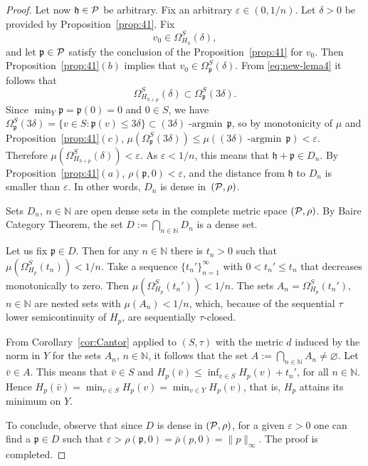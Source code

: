 \documentclass[12pt,leqno]{article}
\theoremstyle{definition}
\theoremstyle{remark}
\def\ds{\displaystyle}
\def\N{\mathbb{N}}
\def\eps{\varepsilon}
\DeclareMathOperator*{\argmin}{-argmin\,}
\begin{document}
\begin{proof}
\smallskip

Let now $\mathfrak{h}\in \cal{P}$ be arbitrary. Fix an arbitrary $\varepsilon \in (0,1/n)$.
Let $\delta > 0$ be provided by Proposition~\ref{prop:41}. Fix
$$
  v_0 \in \Omega_{H_h}^S (\delta),
$$
and let $ \mathfrak{p}\in \cal{P}$ satisfy the conclusion of the Proposition~\ref{prop:41} for $v_0$. Then Proposition~\ref{prop:41}$(b)$ implies that $v_0\in \Omega_{\mathfrak{p}}^S(\delta)$. From  \eqref{eq:new-lema4} it follows that
$$
  \Omega_{H_{h+p}}^S(\delta) \subset \Omega_{\mathfrak{p}}^S (3\delta).
$$
Since $\min_Y \mathfrak{p} = \mathfrak{p}(0)= 0$ and $0\in S$, we have $\Omega^S_\mathfrak{p}(3\delta) = \{v\in S:\mathfrak{p}(v)\le 3\delta\}\subset (3\delta)\argmin \mathfrak{p}$, so by monotonicity of $\mu$ and Proposition~\ref{prop:41}$(c)$, $\mu(\Omega^S_\mathfrak{p}(3\delta))\le \mu((3\delta)\argmin\mathfrak{p}) <\varepsilon$. Therefore $\mu (\Omega_{H_{h+p}}^S(\delta)) < \varepsilon$.
As $\varepsilon<1/n$, this means that $\mathfrak{h}+\mathfrak{p}\in D_n$. By  Proposition~\ref{prop:41}$(a)$, $\rho(\mathfrak{p},0)<\varepsilon$, and the distance from $\mathfrak{h}$ to $D_n$ is smaller than $\eps$. In other words, $D_n$ is dense in~$(\cal{P},\rho)$.



Sets $D_n$, $n\in \N$  are open dense sets in the complete metric space $({\cal{P}},\rho)$. By Baire Category Theorem, the set $\ds D:=\bigcap_{n\in \N} D_n$ is a dense set.

Let us fix $\mathfrak{p}\in D$. Then for any $n\in \N$ there is $t_n>0$ such that $\mu (\Omega_{H_p}^S(t_n))<1/n$. Take a sequence $\{t_n'\}_{n=1}^\infty$ with $0 < t_n' \le t_n$ that decreases monotonically to zero. Then $\mu (\Omega_{H_p}^S(t_n'))<1/n$. The sets  $A_n=\Omega_{H_p}^S(t_n')$, $n\in \N$  are  nested sets with $\mu(A_n)<1/n$, which, because of the sequential $\tau$ lower semicontinuity of $H_p$, are   sequentially $\tau$-closed.

From Corollary~\ref{cor:Cantor}   applied  to $(S,\tau)$ with the metric $d$ induced by the  norm in $Y$ for the sets $A_n$, $n\in \N$, it follows that the set $\ds A:=\bigcap_{n\in \N} A_n\neq\varnothing$. Let $\bar v\in A$. This means that $\bar v\in S$ and $\ds H_p(\bar v)\le \inf_{v\in S} H_p( v) +t_n'$, for all $n\in \N$. Hence $H_p(\bar v)= \min_{v\in S} H_p(v)=\min_{v\in Y} H_p(v)$, that is, $H_p$ attains its minimum on $Y$.

To conclude,  observe that since $D$ is dense in $({\cal{P}},\rho)$, for a given $\eps >0$  one can find a  $\mathfrak{p}\in D$   such that $\eps>\rho(\mathfrak{p},0)=\bar\rho(p,0)=\|p\|_\infty$. The proof is completed.
\end{proof}
\end{document}
